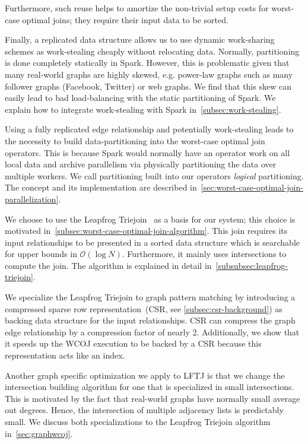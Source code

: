 Furthermore, such reuse helps to amortize the non-trivial setup costs for worst-case optimal joins;
they require their input data to be sorted.

Finally, a replicated data structure allows us to use dynamic work-sharing schemes as work-stealing cheaply without relocating
data.
Normally, partitioning is done completely statically in Spark.
However, this is problematic given that many real-world graphs are highly skewed, e.g. power-law graphs such as many follower graphs
(Facebook, Twitter) or web graphs.
We find that this skew can easily lead to bad load-balancing with the static partitioning of Spark.
We explain how to integrate work-stealing with Spark in~\cref{subsec:work-stealing}.

Using a fully replicated edge relationship and potentially work-stealing leads to the necessity to build data-partitioning into
the worst-case optimal join operators.
This is because Spark would normally have an operator work on all local data and archive parallelism via physically partitioning the
data over multiple workers.
We call partitioning built into our operators \textit{logical} partitioning.
The concept and its implementation are described in~\cref{sec:worst-case-optimal-join-parallelization}.

We choose to use the Leapfrog Triejoin~\cite{lftj} as a basis for our system;
this choice is motivated in~\cref{subsec:worst-case-optimal-join-algorithm}.
This join requires its input relationships to be presented in a sorted data structure which is searchable for upper bounds in
$\mathcal{O} (\log N)$.
Furthermore, it mainly uses intersections to compute the join.
The algorithm is explained in detail in~\cref{subsubsec:leapfrog-triejoin}.

We specialize the Leapfrog Triejoin to graph pattern matching by introducing a compressed sparse row representation~(\textsc{CSR}, see
\cref{subsec:csr-background}) as backing data structure for the input relationships.
\textsc{CSR} can compress the graph edge relationship by a compression factor of nearly 2.
Additionally, we show that it speeds up the \textsc{WCOJ} execution to be backed by a \textsc{CSR} because this representation
acts like an index.

Another graph specific optimization we apply to \textsc{LFTJ} is that we change the intersection building algorithm for one
that is specialized in small intersections.
This is motivated by the fact that real-world graphs have normally small average out degrees.
Hence, the intersection of multiple adjacency lists is predictably small.
We discuss both specializations to the Leapfrog Triejoin algorithm in~\cref{sec:graphwcoj}.


















